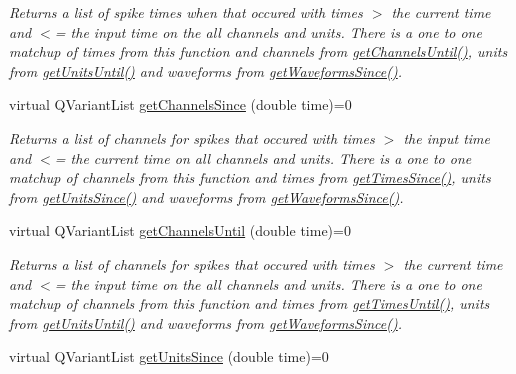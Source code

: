 \begin{DoxyCompactItemize}
\begin{DoxyCompactList}\small\item\em Returns a list of spike times when that occured with times $>$ the current time and $<$= the input time on the all channels and units. There is a one to one matchup of times from this function and channels from \hyperlink{class_picto_1_1_spike_reader_aa0b0778b7298d76fa3f2d50911fabbd0}{get\-Channels\-Until()}, units from \hyperlink{class_picto_1_1_spike_reader_a0ac51134841226a5dc2172a5a899eea9}{get\-Units\-Until()} and waveforms from \hyperlink{class_picto_1_1_spike_reader_a881564caff97cd2949847779de89b5ca}{get\-Waveforms\-Since()}. \end{DoxyCompactList}\item 
\hypertarget{class_picto_1_1_spike_reader_a24a5b0c59b6285c35932bb0f06ddb23c}{virtual Q\-Variant\-List \hyperlink{class_picto_1_1_spike_reader_a24a5b0c59b6285c35932bb0f06ddb23c}{get\-Channels\-Since} (double time)=0}\label{class_picto_1_1_spike_reader_a24a5b0c59b6285c35932bb0f06ddb23c}

\begin{DoxyCompactList}\small\item\em Returns a list of channels for spikes that occured with times $>$ the input time and $<$= the current time on all channels and units. There is a one to one matchup of channels from this function and times from \hyperlink{class_picto_1_1_spike_reader_a7c4b527d541cd2dd9f5b50aed54a000c}{get\-Times\-Since()}, units from \hyperlink{class_picto_1_1_spike_reader_ab09fef03ca5abab5b661fc0a2f4c5ed9}{get\-Units\-Since()} and waveforms from \hyperlink{class_picto_1_1_spike_reader_a881564caff97cd2949847779de89b5ca}{get\-Waveforms\-Since()}. \end{DoxyCompactList}\item 
\hypertarget{class_picto_1_1_spike_reader_aa0b0778b7298d76fa3f2d50911fabbd0}{virtual Q\-Variant\-List \hyperlink{class_picto_1_1_spike_reader_aa0b0778b7298d76fa3f2d50911fabbd0}{get\-Channels\-Until} (double time)=0}\label{class_picto_1_1_spike_reader_aa0b0778b7298d76fa3f2d50911fabbd0}

\begin{DoxyCompactList}\small\item\em Returns a list of channels for spikes that occured with times $>$ the current time and $<$= the input time on the all channels and units. There is a one to one matchup of channels from this function and times from \hyperlink{class_picto_1_1_spike_reader_a23634600fe4ee36cf5efe834f0c3823b}{get\-Times\-Until()}, units from \hyperlink{class_picto_1_1_spike_reader_a0ac51134841226a5dc2172a5a899eea9}{get\-Units\-Until()} and waveforms from \hyperlink{class_picto_1_1_spike_reader_a881564caff97cd2949847779de89b5ca}{get\-Waveforms\-Since()}. \end{DoxyCompactList}\item 
\hypertarget{class_picto_1_1_spike_reader_ab09fef03ca5abab5b661fc0a2f4c5ed9}{virtual Q\-Variant\-List \hyperlink{class_picto_1_1_spike_reader_ab09fef03ca5abab5b661fc0a2f4c5ed9}{get\-Units\-Since} (double time)=0}\label{class_picto_1_1_spike_reader_ab09fef03ca5abab5b661fc0a2f4c5ed9}


\end{DoxyCompactItemize}
